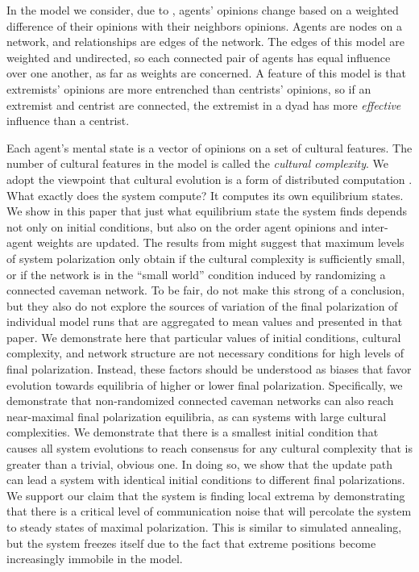 \documentclass[11pt,letterpaper]{article}
\begin{document}
In the model we consider, due to , agents' opinions
change based on a weighted difference of their opinions with their neighbors
opinions. Agents are nodes on a network, and relationships are edges of the
network. The edges of this model are weighted and undirected, so each 
connected pair of agents has equal influence over one another, as far as
weights are concerned. A feature of this model is that extremists' opinions
are more entrenched than centrists' opinions, so if an extremist and centrist
are connected, the extremist in a dyad has more \emph{effective} influence 
than a centrist. 

Each agent's mental state is a vector of opinions on a set of cultural features.
The number of cultural features in the model is called the \emph{cultural 
complexity}. We adopt the viewpoint that cultural evolution is a form
of distributed computation \cite{Smaldino2013}. What exactly does the system
compute? It computes its own equilibrium states. We show in this paper that
just what equilibrium state the system finds depends not only on initial
conditions, but also on the order agent opinions and inter-agent weights are 
updated. The results from  might suggest that maximum 
levels of system polarization only obtain if the cultural complexity is 
sufficiently small, or if the network is in the ``small world'' condition
induced by randomizing a connected caveman network. To be fair, 
do not make this strong of a conclusion, but they also do not explore the
sources of variation of the final polarization of individual model runs 
that are aggregated to mean values and presented in that paper.
We demonstrate here that particular values of 
initial conditions, cultural complexity, and 
network structure are not necessary conditions for high levels of 
final polarization. Instead, these factors should be understood as biases 
that favor evolution towards equilibria of higher or lower final polarization. 
Specifically, we demonstrate that non-randomized connected caveman 
networks can also reach near-maximal final polarization 
equilibria, as can systems with large cultural
complexities. We demonstrate that there is a smallest initial condition that
causes all system evolutions to reach consensus for any cultural complexity
that is greater than a trivial, obvious one. In doing so, we show that the
update path can lead a system with identical initial conditions to different 
final polarizations. We support our claim that the system is finding local 
extrema by demonstrating that there is a critical level of communication noise
that will percolate the system to steady states of maximal polarization. 
This is similar to simulated annealing, but the system freezes itself 
due to the fact that extreme positions become increasingly immobile in 
the  model.
\end{document}
